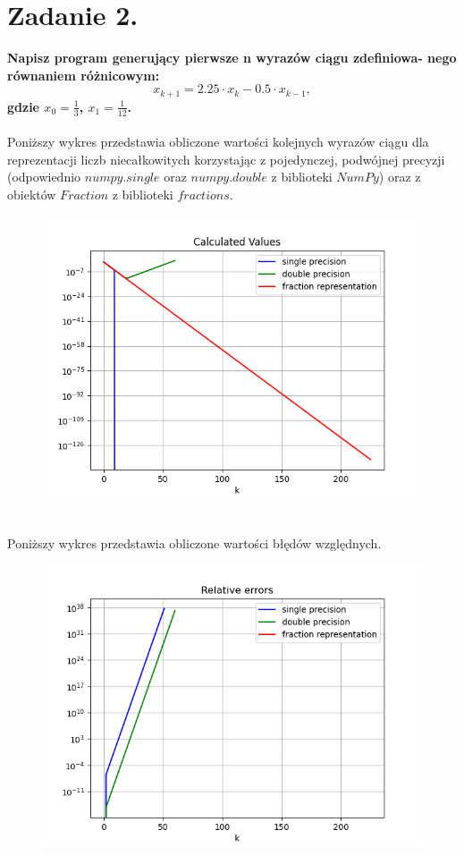 \documentclass{article}
\begin{document}
\section*{Zadanie 2.}
\textbf{Napisz program generujący pierwsze n wyrazów ciągu zdefiniowa-
nego równaniem różnicowym:
$$x_{k+1} = 2.25\cdot x_k - 0.5\cdot x_{k-1},$$
 gdzie $x_0 = \frac{1}{3}$, $ x_1 = \frac{1}{12}$.}
\\\\
Poniższy wykres przedstawia obliczone wartości 
kolejnych wyrazów ciągu dla reprezentacji liczb niecałkowitych 
korzystając z pojedynczej, podwójnej precyzji (odpowiednio
$numpy.single$ oraz $numpy.double$ z biblioteki $NumPy$) oraz z obiektów 
$Fraction$ z biblioteki $fractions$.
\begin{figure}[ht!]
    \includegraphics[width=\linewidth]{figures/calculated_values.png}
\end{figure}
\\
Poniższy wykres przedstawia obliczone wartości 
błędów względnych.
\begin{figure}[ht!]
    \includegraphics[width=\linewidth]{figures/errors.png}
\end{figure}
\end{document}
